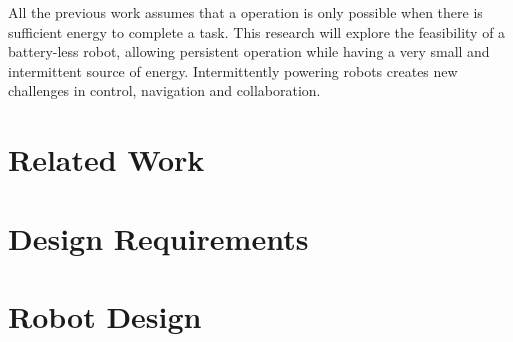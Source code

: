 \documentclass[letterpaper, 10 pt, conference]{ieeeconf}  %
\begin{document}



All the previous work assumes that a operation is only possible when there is sufficient energy to complete a task. 
This research will explore the feasibility of a battery-less robot, allowing persistent operation while having a very small and intermittent source of energy.
Intermittently powering robots creates new challenges in control, navigation and collaboration.

\section{Related Work}




\section{Design Requirements}




\section{Robot Design}
\end{document}
